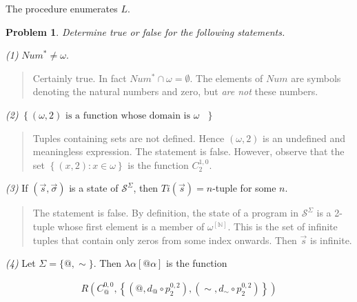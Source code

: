 \documentclass[a4paper, 12pt]{article}
\newtheorem{problem}{Problem}
\newtheorem{problem}{Problem}
\begin{document}
The procedure enumerates $L$.

\pagebreak 

\begin{problem}
    Determine true or false for the following statements.
\end{problem}

\textit{(1)} $Num^{*} \neq \omega$. 


\small
\begin{quote}

    Certainly true. In fact $Num^{*} \cap \omega = \emptyset$. The elements of
    $Num$ are symbols denoting the natural numbers and zero, but \textit{are
    not} these numbers.
\end{quote}
\normalsize


\textit{(2)} $\left\{ (\omega, 2) \text{ is a function whose domain is $\omega$ } \right\} $


\small
\begin{quote}

Tuples containing sets are not defined. Hence $(\omega, 2)$ is an undefined and
meaningless expression. The statement is false. However, observe that the set
$\left\{ (x, 2) : x \in \omega \right\} $ is the function $C_{2}^{1, 0}$.

\end{quote}
\normalsize



\textit{(3)} If $(\vec{s}, \vec{\sigma})$ is a state of $\mathcal{S}^{\Sigma}$,
then $Ti(\vec{s}) = n$-tuple for some $n$.



\small
\begin{quote}

The statement is false. By definition, the state of a program 
in $\mathcal{S}^{\Sigma}$ is a 2-tuple whose first element is a member of
$\omega^{[\mathbb{N}]}$. This is the set of infinite tuples that contain only
zeros from some index onwards. Then $\vec{s}$ is infinite.

\end{quote}
\normalsize



\textit{(4)} Let $\Sigma = \{@, \sim \}$. Then $\lambda \alpha \left[  @\alpha
\right]$ is the function 

\begin{align*}
    R \left( C_{@}^{0, 0}, \left\{ (@, d_{@} \circ p_2^{0, 2}), (\sim, d_{\sim }
    \circ p_2^{0, 2}) \right\}  \right) 
\end{align*}
\end{document}
